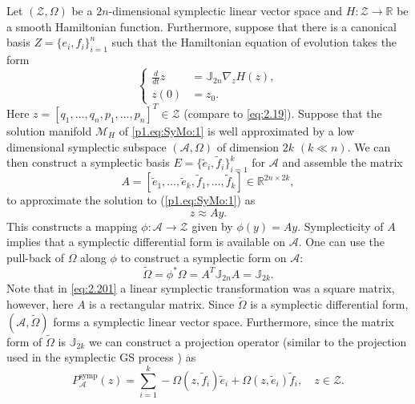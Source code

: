 Let $(\mathcal Z,\Omega)$ be a $2n$-dimensional symplectic linear vector space and $H: \mathcal Z \to \mathbb R$ be a smooth Hamiltonian function. Furthermore, suppose that there is a canonical basis $Z = \{e_i,f_i\}_{i=1}^n$ such that the Hamiltonian equation of evolution takes the form
\begin{equation} \label{p1.eq:SyMo:1}
	\left\{
	\begin{aligned}
		\frac d {dt} z &= \mathbb J_{2n} \nabla_z H(z), \\
		z(0) &= z_0.
	\end{aligned}
	\right.
\end{equation}
Here $z = [q_1,\dots,q_n,p_1,\dots,p_n]^T\in \mathcal Z$  (compare to \eqref{eq:2.19}). Suppose that the solution manifold $\mathcal M_H$ of \eqref{p1.eq:SyMo:1} is well approximated by a low dimensional symplectic subspace $(\mathcal A,\Omega)$ of dimension $2k$ $(k\ll n)$. We can then construct a symplectic basis $E=\{ \tilde e_i,\tilde f_i \}_{i=1}^k$ for $\mathcal A$ and assemble the matrix
\begin{equation} \label{p1.eq:SyMo:1.1}
	A = [\tilde e_1,\dots,\tilde e_k,\tilde f_1,\dots,\tilde f_k]\in \mathbb R^{2n\times 2k},
\end{equation} \label{p1.eq:SyMo:1.2}
to approximate the solution to (\ref{p1.eq:SyMo:1}) as
\begin{equation} \label{eq:SyMo:1.2}
	z \approx A y.
\end{equation}
This constructs a mapping $\phi:\mathcal A \to \mathcal Z$ given by $\phi(y) = Ay$. Symplecticity of $A$ implies that a symplectic differential form is available on $\mathcal A$. One can use the pull-back of $\Omega$ along $\phi$ to construct a symplectic form on $\mathcal A$:
\begin{equation} \label{p1.eq:SyMo:1.3}
	\tilde \Omega = \phi^*\Omega = A^T \mathbb J_{2n} A = \mathbb J_{2k}.
\end{equation}
Note that in \eqref{eq:2.201} a linear symplectic transformation was a square matrix, however, here $A$ is a rectangular matrix. Since $\tilde \Omega$ is a symplectic differential form, $(\mathcal A, \tilde \Omega)$ forms a symplectic linear vector space. Furthermore, since the matrix form of $\tilde \Omega$ is $\mathbb J_{2k}$ we can construct a projection operator (similar to the projection used in the symplectic GS process ) as
\begin{equation} \label{p1.eq:SyMo:1.4}
	P^{\text{symp}}_{\mathcal A}(z) = \sum_{i=1}^k -\Omega(z,\tilde f_i)\tilde e_i + \Omega(z,\tilde e_i) \tilde f_i, \quad z\in \mathcal Z.
\end{equation}
